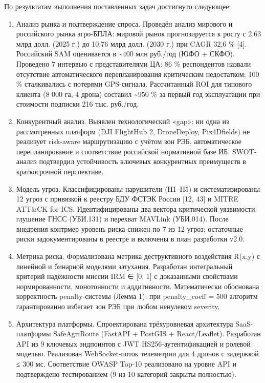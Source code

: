\documentclass[14pt,a4paper]{extarticle}
\begin{document}
По результатам выполнения поставленных задач достигнуто следующее:

\begin{enumerate}
\def\labelenumi{\arabic{enumi}.}
\item
  Анализ рынка и подтверждение спроса. Проведён анализ мирового и российского рынка агро-БПЛА: мировой рынок прогнозируется к росту с 2,63 млрд долл. (2025 г.) до 10,76 млрд долл. (2030 г.) при CAGR 32,6 \% {[}4{]}. Российский SAM оценивается в \textasciitilde400 млн руб./год (ЮФО + СКФО). Проведено 7 интервью с представителями ЦА: 86 \% респондентов назвали отсутствие автоматического перепланирования критическим недостатком; 100 \% сталкивались с потерями GPS-сигнала. Рассчитанный ROI для типового клиента (8 000 га, 4 дрона) составил \textasciitilde950 \% за первый год эксплуатации при стоимости подписки 216 тыс. руб./год.
\item
  Конкурентный анализ. Выявлен технологический «gap»: ни одна из рассмотренных платформ (DJI FlightHub 2, DroneDeploy, Pix4Dfields) не реализует risk-aware маршрутизацию с учётом зон РЭБ, автоматическое перепланирование и соответствие российской нормативной базе ИБ. SWOT-анализ подтвердил устойчивость ключевых конкурентных преимуществ в краткосрочной перспективе.
\item
  Модель угроз. Классифицированы нарушители (Н1--Н5) и систематизированы 12 угроз с привязкой к реестру БДУ ФСТЭК России {[}12, 43{]} и MITRE ATT\&CK for ICS. Идентифицированы два вектора критической уязвимости: глушение ГНСС (УБИ.131) и перехват MAVLink (УБИ.014). После внедрения контрмер уровень риска снижен по 7 из 12 угроз; остаточные риски задокументированы в реестре и включены в план разработки v2.0.
\item
  Метрика риска. Формализована метрика деструктивного воздействия R(x,y) с линейной и бинарной моделями затухания. Разработан интегральный критерий надёжности миссии IRM ∈ {[}0, 1{]} с доказанными свойствами нормированности, монотонности и аддитивности. Математически обоснована корректность penalty-системы (Лемма 1): при penalty\_coeff = 500 алгоритм гарантированно избегает зон РЭБ при любом ненулевом severity.
\item
  Архитектура платформы. Спроектирована трёхуровневая архитектура SaaS-платформы SafeAgriRoute (FastAPI + PostGIS + React/Leaflet). Разработан API из 9 ключевых эндпоинтов с JWT HS256-аутентификацией и ролевой моделью. Реализован WebSocket-поток телеметрии для 4 дронов с задержкой ≤ 300 мс. Соответствие OWASP Top-10 реализовано на уровне API и подтверждено тестированием (9 из 10 категорий закрыты полностью).

\end{enumerate}
\end{document}
